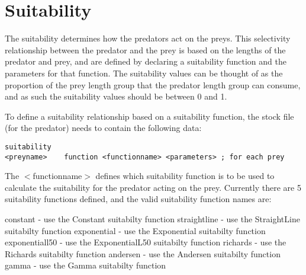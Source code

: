 \documentclass[10pt,twoside]{book}
\begin{document}
\section{Suitability}\label{sec:suitability}
The suitability determines how the predators act on the preys.  This selectivity relationship between the predator and the prey is based on the lengths of the predator and prey, and are defined  by declaring a suitability function and the parameters for that function.  The suitability values can be thought of as the proportion of the prey length group that the predator length group can consume, and as such the suitability values should be between 0 and 1.




\bigskip
To define a suitability relationship based on a suitability function, the stock file (for the predator) needs to contain the following data:

{\small\begin{verbatim}
suitability
<preyname>    function <functionname> <parameters> ; for each prey
\end{verbatim}}

The $<$functionname$>$ defines which suitability function is to be used to calculate the suitability for the predator acting on the prey.  Currently there are 5 suitability functions defined, and the valid suitability function names are:

\bigskip
constant - use the Constant suitabilty function\newline
straightline - use the StraightLine suitabilty function\newline
exponential - use the Exponential suitabilty function\newline
exponentiall50 - use the ExponentialL50 suitabilty function\newline
richards - use the Richards suitabilty function\newline
andersen - use the Andersen suitabilty function\newline
gamma - use the Gamma suitabilty function
\end{document}
